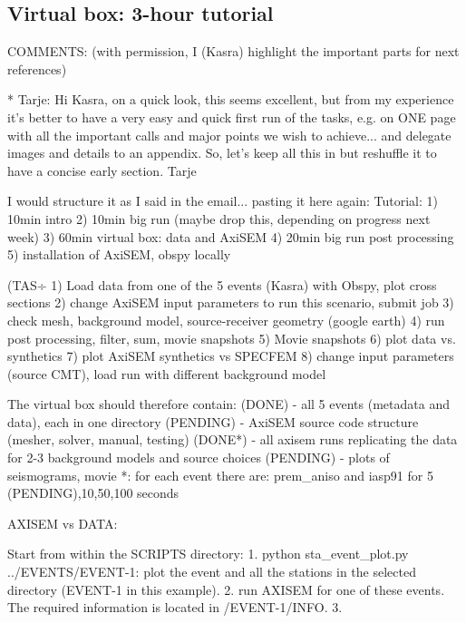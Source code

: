 \subsection{Virtual box: 3-hour tutorial}

COMMENTS: (with permission, I (Kasra) highlight the important parts for next references)

* Tarje:
Hi Kasra, on a quick look, this seems excellent, but from my experience it’s better to have a very easy and quick first run of the tasks, e.g. on ONE page with all the important calls and major points we wish to achieve... and delegate images and details to an appendix. So, let’s keep all this in but reshuffle it to have a concise early section. Tarje

I would structure it as I said in the email... pasting it here again:
Tutorial:
1) 10min intro
2) 10min big run (maybe drop this, depending on progress next week)
3) 60min virtual box: data and AxiSEM
4) 20min big run post processing
5) installation of AxiSEM, obspy locally

(TAS÷
1) Load data from one of the 5 events (Kasra) with Obspy, plot cross sections
2) change AxiSEM input parameters to run this scenario, submit job
3) check mesh, background model, source-receiver geometry (google earth)
4) run post processing, filter, sum, movie snapshots
5) Movie snapshots
6) plot data vs. synthetics
7) plot AxiSEM synthetics vs SPECFEM
8) change input parameters (source CMT), load run with different background model

The virtual box should therefore contain:
(DONE)        - all 5 events (metadata and data), each in one directory
(PENDING) - AxiSEM source code structure (mesher, solver, manual, testing)
(DONE*)       - all axisem runs replicating the data for 2-3 background models and source choices
(PENDING)  - plots of seismograms, movie
*: for each event there are: prem\_aniso and iasp91 for 5 (PENDING),10,50,100 seconds



AXISEM vs DATA:


Start from within the SCRIPTS directory:
1. python sta\_event\_plot.py ../EVENTS/EVENT-1: plot the event and all the stations in the selected directory (EVENT-1 in this example).
2. run AXISEM for one of these events. The required information is located in /EVENT-1/INFO.
3.



































